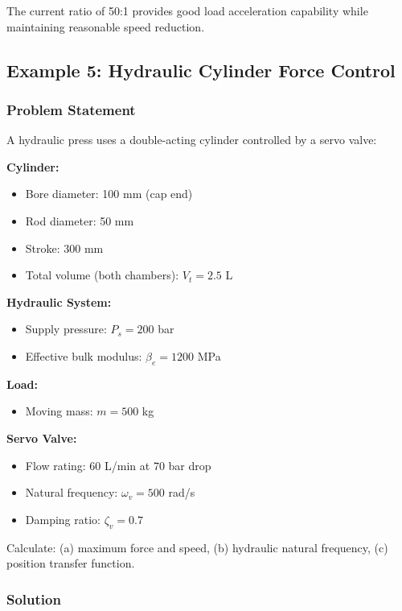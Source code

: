 The current ratio of 50:1 provides good load acceleration capability while maintaining reasonable speed reduction.

\subsection{Example 5: Hydraulic Cylinder Force Control}

\subsubsection{Problem Statement}

A hydraulic press uses a double-acting cylinder controlled by a servo valve:

\textbf{Cylinder:}
\begin{itemize}
    \item Bore diameter: 100 mm (cap end)
    \item Rod diameter: 50 mm
    \item Stroke: 300 mm
    \item Total volume (both chambers): $V_t = 2.5$ L
\end{itemize}

\textbf{Hydraulic System:}
\begin{itemize}
    \item Supply pressure: $P_s = 200$ bar
    \item Effective bulk modulus: $\beta_e = 1200$ MPa
\end{itemize}

\textbf{Load:}
\begin{itemize}
    \item Moving mass: $m = 500$ kg
\end{itemize}

\textbf{Servo Valve:}
\begin{itemize}
    \item Flow rating: 60 L/min at 70 bar drop
    \item Natural frequency: $\omega_v = 500$ rad/s
    \item Damping ratio: $\zeta_v = 0.7$
\end{itemize}

Calculate: (a) maximum force and speed, (b) hydraulic natural frequency, (c) position transfer function.

\subsubsection{Solution}

